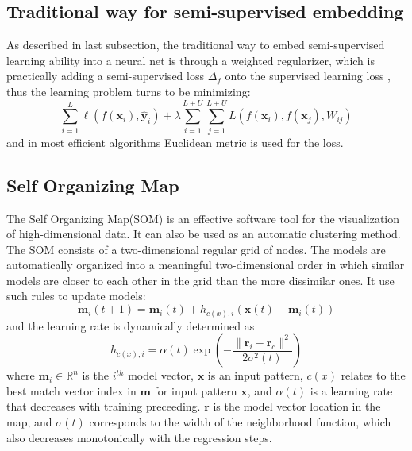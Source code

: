 \documentclass[3p,times,procedia]{elsarticle}
\begin{document}
\subsection{Traditional way for 
semi-supervised embedding}
As described in last subsection, 
the traditional way to embed semi-supervised 
learning ability into a neural net is through 
a weighted regularizer, which is practically 
adding a semi-supervised loss $\Delta_f$
onto the supervised learning loss
\cite{weston2012deep}, thus the learning 
problem turns to be minimizing:
\begin{equation}
	\sum^L_{i=1}\ell\left(
	f(\mathbf{x}_i),\mathbf{\hat{y}}_i
	\right) +
	\lambda\sum^{L+U}_{i=1}\sum^{L+U}_{j=1}
	L\left(
	f(\mathbf{x}_i),
	f(\mathbf{x}_j),
	W_{ij}
	\right)
	\label{eq:7}
\end{equation}
and in most efficient algorithms Euclidean 
metric is used for the loss.

\subsection{Self Organizing Map}
The Self Organizing Map(SOM) is an effective 
software tool for the visualization of 
high-dimensional data. It can also be used 
as an automatic clustering method. The SOM
consists of a two-dimensional regular grid
of nodes. The models are automatically 
organized into a meaningful two-dimensional
order in which similar models are closer to
each other in the grid than the more dissimilar
ones\cite{kohonen1998self}.
It use such rules to update models:
\begin{equation}
	\mathbf{m}_i(t+1)=\mathbf{m}_i(t)+
	h_{c(x),i}\left(
	\mathbf{x}(t)-\mathbf{m}_i(t)
	\right)
	\label{eq:8}
\end{equation}
and the learning rate is dynamically determined
as
\begin{equation}
	h_{c(x),i} = \alpha(t)\exp\left(
	-\frac{\|\mathbf{r}_i-\mathbf{r}_c\|^2}
	{2\sigma^2(t)}
	\right)
	\label{eq:9}
\end{equation}
where $\mathbf{m}_i\in\mathbb{R}^n$ 
is the $i^{th}$ model vector, 
$\mathbf{x}$ is an input pattern,
$c(x)$ relates to the best match vector index
in $\mathbf{m}$ for input pattern $\mathbf{x}$,
and $\alpha(t)$ is a learning rate that 
decreases with training preceeding.
$\mathbf{r}$ is the model vector location in 
the map, and $\sigma(t)$ corresponds to the 
width of the neighborhood function, which 
also decreases monotonically with the 
regression steps.
\end{document}
